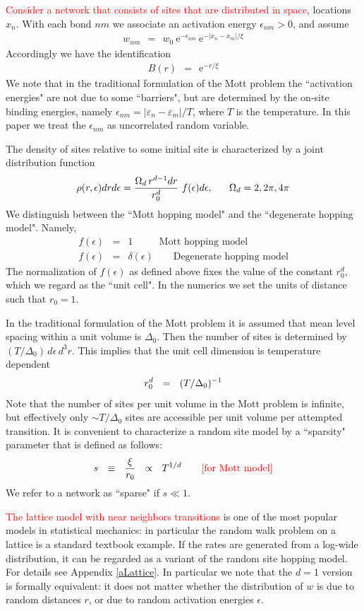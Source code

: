 \documentclass[aps,prb,floats,floatfix,twocolumn]{revtex4}
\newcommand{\eexp}{\mbox{e}^}
\newcommand{\mylabel}[1]{\label{#1}}
\newcommand{\beq}{\begin{eqnarray}}
\newcommand{\eeq}{\end{eqnarray}}
\newcommand{\be}[1]{\begin{eqnarray}\ifthenelse{#1=-1}
{\nonumber}{\ifthenelse{#1=0}{}{\mylabel{e#1}}}}
\newcommand{\rmrk}[1]{\textcolor{red}{#1}}
\begin{document}
\rmrk{Consider a network that consists of sites 
that are distributed in space}, locations $x_n$.
With each bond $nm$ we associate an activation 
energy $\epsilon_{nm}>0$, and assume   
%
\beq
w_{nm} \ \ = \ \  w_0 \ \eexp{-\epsilon_{nm}} \ \eexp{-|x_n-x_m|/\xi} 
\eeq
%
Accordingly we have the identification 
%
\beq
B(r) \ \ = \ \ \eexp{-r/\xi} 
\eeq
%
We note that in the traditional formulation 
of the Mott problem the ``activation energies"
are not due to some ``barriers", 
but are determined by the on-site binding energies, 
namely $\epsilon_{nm}=|\varepsilon_n-\varepsilon_m|/T$,   
where $T$ is the temperature.
In this paper we treat the $\epsilon_{nm}$ 
as uncorrelated random variable.

The density of sites relative to some initial site 
is characterized  by a joint distribution function 
%
\be{7}
\rho(r,\epsilon)drd\epsilon = \frac{\Omega_d \, r^{d-1}dr}{r_0^{d}} \ f(\epsilon)d\epsilon,     
\ \ \ \ \ \Omega_d=2,2\pi,4\pi
\eeq
%
We distinguish between the ``Mott hopping model" 
and the ``degenerate hopping model". Namely, 
%
\beq
f(\epsilon) &=& 1  \ \ \ \ \ \ \ \ \ \ \ \ \mbox{Mott hopping model}   \\        
f(\epsilon) &=& \delta(\epsilon) \ \ \ \ \ \ \ \ \ \mbox{Degenerate hopping model}
\eeq
%
The normalization of $f(\epsilon)$ as defined above 
fixes the value of the constant $r_0^d$, which we regard 
as the ``unit cell". 
In the numerics we set the units of distance such that ${r_0=1}$.

In the traditional formulation of the Mott problem 
it is assumed that mean level spacing within a unit volume is $\Delta_0$. 
Then the number of sites is determined by ${(T/\Delta_0) \, d\epsilon \, d^3r}$. 
This implies that the unit cell dimension is temperature dependent
%
\be{100}
r_0^d \ \ = \ \ (T/\Delta_0)^{-1}
\eeq
%
Note that the number of sites per unit volume 
in the Mott problem is infinite, but effectively 
only $\sim T/\Delta_0$ sites are accessible 
per unit volume per attempted transition. 
%
It is convenient to characterize a random 
site model by a ``sparsity" parameter that is defined 
as follows:
%
\be{101}
s \ \ \equiv \ \ \frac{\xi}{r_0} \ \ \propto \ \ T^{1/d} 
\ \ \ \ \ \ \rmrk{\text{[for Mott model]}}
\eeq
%
We refer to a network as ``sparse" if $s\ll1$.


\rmrk{The lattice model with near neighbors transitions} 
is one of the most popular models in statistical mechanics: 
in particular the random walk problem on a lattice 
is a standard textbook example. If the rates are 
generated from a log-wide distribution, it can be regarded 
as a variant of the random site hopping model. 
For details see Appendix \ref{aLattice}.
% 
In particular we note that the $d{=}1$ version is 
formally equivalent: it does not matter whether 
the distribution of $w$ is due to random distances $r$, 
or due to random activation energies $\epsilon$.  
\end{document}
